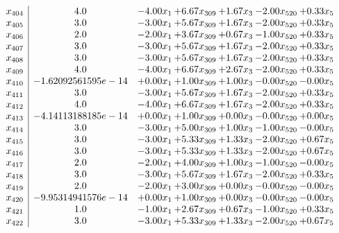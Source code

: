 \documentclass[8pt]{article}
\begin{document}
\[\begin{array}{c| c c@{\hskip 2pt} c@{\hskip 2pt} c@{\hskip 2pt} c@{\hskip 2pt} c@{\hskip 2pt} }
 x_{404}   &  4.0 & -4.00 x_{1} & +  6.67 x_{309} & +  1.67 x_{3} & -2.00 x_{520} & +  0.33 x_{5}\\
 x_{405}   &  3.0 & -3.00 x_{1} & +  5.67 x_{309} & +  1.67 x_{3} & -2.00 x_{520} & +  0.33 x_{5}\\
 x_{406}   &  2.0 & -2.00 x_{1} & +  3.67 x_{309} & +  0.67 x_{3} & -1.00 x_{520} & +  0.33 x_{5}\\
 x_{407}   &  3.0 & -3.00 x_{1} & +  5.67 x_{309} & +  1.67 x_{3} & -2.00 x_{520} & +  0.33 x_{5}\\
 x_{408}   &  3.0 & -3.00 x_{1} & +  5.67 x_{309} & +  1.67 x_{3} & -2.00 x_{520} & +  0.33 x_{5}\\
 x_{409}   &  4.0 & -4.00 x_{1} & +  6.67 x_{309} & +  2.67 x_{3} & -2.00 x_{520} & +  0.33 x_{5}\\
 x_{410}   &  -1.62092561595e-14 & +  0.00 x_{1} & +  1.00 x_{309} & +  1.00 x_{3} & -0.00 x_{520} & -0.00 x_{5}\\
 x_{411}   &  3.0 & -3.00 x_{1} & +  5.67 x_{309} & +  1.67 x_{3} & -2.00 x_{520} & +  0.33 x_{5}\\
 x_{412}   &  4.0 & -4.00 x_{1} & +  6.67 x_{309} & +  1.67 x_{3} & -2.00 x_{520} & +  0.33 x_{5}\\
 x_{413}   &  -4.14113188185e-14 & +  0.00 x_{1} & +  1.00 x_{309} & +  0.00 x_{3} & -0.00 x_{520} & +  0.00 x_{5}\\
 x_{414}   &  3.0 & -3.00 x_{1} & +  5.00 x_{309} & +  1.00 x_{3} & -1.00 x_{520} & -0.00 x_{5}\\
 x_{415}   &  3.0 & -3.00 x_{1} & +  5.33 x_{309} & +  1.33 x_{3} & -2.00 x_{520} & +  0.67 x_{5}\\
 x_{416}   &  3.0 & -3.00 x_{1} & +  5.33 x_{309} & +  1.33 x_{3} & -2.00 x_{520} & +  0.67 x_{5}\\
 x_{417}   &  2.0 & -2.00 x_{1} & +  4.00 x_{309} & +  1.00 x_{3} & -1.00 x_{520} & -0.00 x_{5}\\
 x_{418}   &  3.0 & -3.00 x_{1} & +  5.67 x_{309} & +  1.67 x_{3} & -2.00 x_{520} & +  0.33 x_{5}\\
 x_{419}   &  2.0 & -2.00 x_{1} & +  3.00 x_{309} & +  0.00 x_{3} & -0.00 x_{520} & -0.00 x_{5}\\
 x_{420}   &  -9.95314941576e-14 & +  0.00 x_{1} & +  1.00 x_{309} & +  0.00 x_{3} & -0.00 x_{520} & -0.00 x_{5}\\
 x_{421}   &  1.0 & -1.00 x_{1} & +  2.67 x_{309} & +  0.67 x_{3} & -1.00 x_{520} & +  0.33 x_{5}\\
 x_{422}   &  3.0 & -3.00 x_{1} & +  5.33 x_{309} & +  1.33 x_{3} & -2.00 x_{520} & +  0.67 x_{5}\\

\end{array}\]
\end{document}
